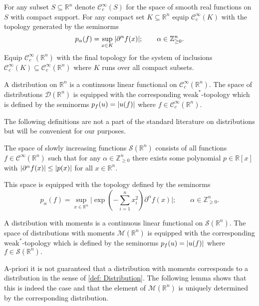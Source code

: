 For any subset $S\subseteq \mathbb{R}^n$ denote $\mathcal{C}_c^\infty(S)$ for the space of smooth real functions on $S$ with compact support.
For any compact set $K\subseteq \mathbb{R}^n$ equip $\mathcal{C}^\infty_c(K)$ with the topology generated by the seminorms
$$p_{\alpha}(f) = \sup_{x\in K} \vert \partial^\alpha f(x) \vert;\qquad \alpha\in \mathbb{Z}_{\geq 0}^n.$$
Equip $\mathcal{C}_c^\infty(\mathbb{R}^n)$ with the final topology for the system of inclusions $\mathcal{C}_c^\infty(K)\subseteq \mathcal{C}_c^\infty(\mathbb{R}^n)$ where $K$ runs over all compact subsets.
\begin{definition}\label{def: Distribution}
  A distribution on $\mathbb{R}^n$ is a continuous linear functional on $\mathcal{C}_c^\infty(\mathbb{R}^n)$.
  The space of distributions $\mathcal{D}(\mathbb{R}^n)$ is equipped with the corresponding $\text{weak}^*$-topology which is defined by the seminorms $p_{f}(u) = \vert u(f) \vert$ where $f\in \mathcal{C}_c^\infty(\mathbb{R}^n).$
\end{definition}
The following definitions are not a part of the standard literature on distributions but will be convenient for our purposes.
\begin{definition}
  The space of slowly increasing functions $\mathcal{S}(\mathbb{R}^n)$ consists of all functions $f\in \mathcal{C}^\infty(\mathbb{R}^n)$ such that for any $\alpha\in \mathbb{Z}_{\geq 0}^n$ there exists some polynomial $p\in \mathbb{R}[x]$ with $\vert \partial^\alpha f(x) \vert\leq \vert p(x) \vert$ for all $x\in\mathbb{R}^n$.

  This space is equipped with the topology defined by the seminorms $$p_{\alpha}(f) = \sup_{x\in \mathbb{R}^n} \vert\exp(-\textstyle\sum_{i=1}^n x_i^2)\partial^\alpha f(x)\vert ;\qquad \alpha\in \mathbb{Z}_{\geq 0}^n.$$
\end{definition}
\begin{definition}\label{def: DistributionWithMoments}
  A distribution with moments is a continuous linear functional on $\mathcal{S}(\mathbb{R}^n)$.
  The space of distributions with moments $\mathcal{M}(\mathbb{R}^n)$ is equipped with the corresponding $\text{weak}^*$-topology which is defined by the seminorms  $p_{f}(u) = \vert u(f) \vert$ where $f\in \mathcal{S}(\mathbb{R}^n).$
\end{definition}
A-priori it is not guaranteed that a distribution with moments corresponds to a distribution in the sense of \cref{def: Distribution}.
The following lemma shows that this is indeed the case and that the element of $\mathcal{M}(\mathbb{R}^n)$ is uniquely determined by the corresponding distribution.
